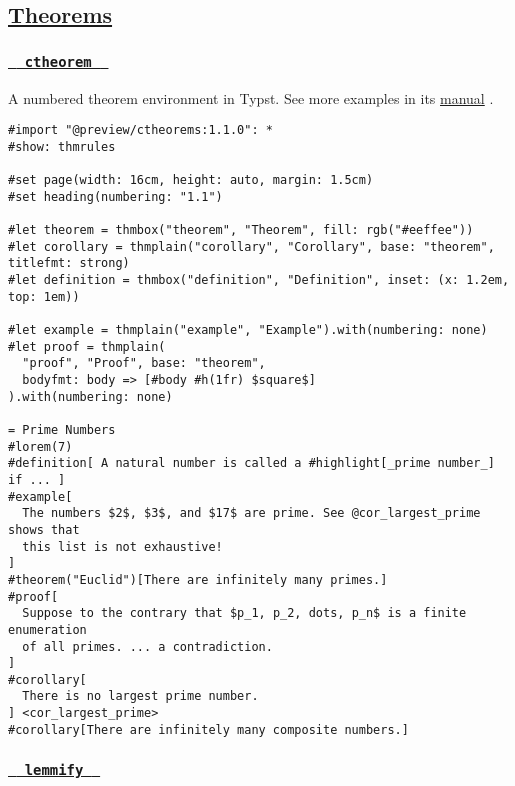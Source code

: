 \pandocbounded{}

\subsection{\texorpdfstring{\hyperref[theorems]{Theorems}}{Theorems}}\label{theorems}

\subsubsection{\texorpdfstring{\hyperref[ctheorem]{\texttt{\ }{\texttt{\ ctheorem\ }}\texttt{\ }}}{  ctheorem  }}\label{ctheorem}

A numbered theorem environment in Typst. See more examples in its
\href{https://github.com/sahasatvik/typst-theorems/blob/main/manual.pdf}{manual}
.

\begin{verbatim}
#import "@preview/ctheorems:1.1.0": *
#show: thmrules

#set page(width: 16cm, height: auto, margin: 1.5cm)
#set heading(numbering: "1.1")

#let theorem = thmbox("theorem", "Theorem", fill: rgb("#eeffee"))
#let corollary = thmplain("corollary", "Corollary", base: "theorem", titlefmt: strong)
#let definition = thmbox("definition", "Definition", inset: (x: 1.2em, top: 1em))

#let example = thmplain("example", "Example").with(numbering: none)
#let proof = thmplain(
  "proof", "Proof", base: "theorem",
  bodyfmt: body => [#body #h(1fr) $square$]
).with(numbering: none)

= Prime Numbers
#lorem(7)
#definition[ A natural number is called a #highlight[_prime number_] if ... ]
#example[
  The numbers $2$, $3$, and $17$ are prime. See @cor_largest_prime shows that
  this list is not exhaustive!
]
#theorem("Euclid")[There are infinitely many primes.]
#proof[
  Suppose to the contrary that $p_1, p_2, dots, p_n$ is a finite enumeration
  of all primes. ... a contradiction.
]
#corollary[
  There is no largest prime number.
] <cor_largest_prime>
#corollary[There are infinitely many composite numbers.]
\end{verbatim}

\pandocbounded{}

\subsubsection{\texorpdfstring{\hyperref[lemmify]{\texttt{\ }{\texttt{\ lemmify\ }}\texttt{\ }}}{  lemmify  }}\label{lemmify}

